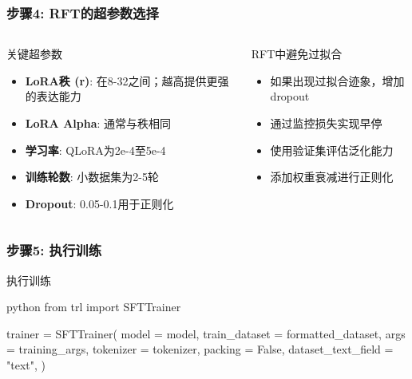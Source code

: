 \documentclass[aspectratio=169]{beamer}
\begin{document}
\begin{frame}[fragile]
	\frametitle{步骤4: RFT的超参数选择}
	\begin{columns}
		\begin{column}{0.48\textwidth}
			\begin{block}{关键超参数}
				\begin{itemize}
					\item \textbf{LoRA秩 (r)}: 在8-32之间；越高提供更强的表达能力
					\item \textbf{LoRA Alpha}: 通常与秩相同
					\item \textbf{学习率}: QLoRA为2e-4至5e-4
					\item \textbf{训练轮数}: 小数据集为2-5轮
					\item \textbf{Dropout}: 0.05-0.1用于正则化
				\end{itemize}
			\end{block}
		\end{column}
		\begin{column}{0.48\textwidth}
			\begin{block}{RFT中避免过拟合}
				\begin{itemize}
					\item 如果出现过拟合迹象，增加dropout
					\item 通过监控损失实现早停
					\item 使用验证集评估泛化能力
					\item 添加权重衰减进行正则化
				\end{itemize}
			\end{block}
		\end{column}
	\end{columns}
\end{frame}

\begin{frame}[fragile]
	\frametitle{步骤5: 执行训练}
	\begin{block}{执行训练}
		\begin{mintedbox}{python}
from trl import SFTTrainer

trainer = SFTTrainer(
    model = model,
    train_dataset = formatted_dataset,
    args = training_args,
    tokenizer = tokenizer,
    packing = False,
    dataset_text_field = "text",
)
		\end{mintedbox}
	\end{block}
\end{frame}
\end{document}
